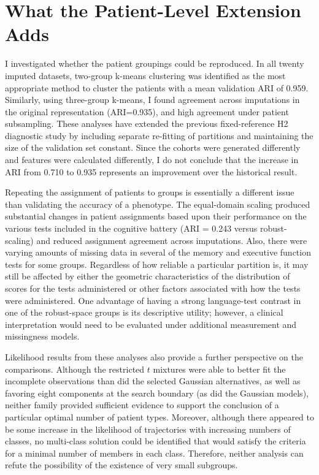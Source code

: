\section{What the Patient-Level Extension Adds}\label{sec:extension_discussion}

I investigated whether the patient groupings could be reproduced. In all twenty imputed datasets, two-group k-means clustering was identified as the most appropriate method to cluster the patients with a mean validation ARI of 0.959. Similarly, using three-group k-means, I found agreement across imputations in the original representation (ARI=0.935), and high agreement under patient subsampling. These analyses have extended the previous fixed-reference H2 diagnostic study by including separate re-fitting of partitions and maintaining the size of the validation set constant. Since the cohorts were generated differently and features were calculated differently, I do not conclude that the increase in ARI from 0.710 to 0.935 represents an improvement over the historical result.

Repeating the assignment of patients to groups is essentially a different issue than validating the accuracy of a phenotype. The equal-domain scaling produced substantial changes in patient assignments based upon their performance on the various tests included in the cognitive battery (ARI = 0.243 versus robust-scaling) and reduced assignment agreement across imputations. Also, there were varying amounts of missing data in several of the memory and executive function tests for some groups. Regardless of how reliable a particular partition is, it may still be affected by either the geometric characteristics of the distribution of scores for the tests administered or other factors associated with how the tests were administered. One advantage of having a strong language-test contrast in one of the robust-space groups is its descriptive utility; however, a clinical interpretation would need to be evaluated under additional measurement and missingness models.

Likelihood results from these analyses also provide a further perspective on the comparisons. Although the restricted $t$ mixtures were able to better fit the incomplete observations than did the selected Gaussian alternatives, as well as favoring eight components at the search boundary (as did the Gaussian models), neither family provided sufficient evidence to support the conclusion of a particular optimal number of patient types. Moreover, although there appeared to be some increase in the likelihood of trajectories with increasing numbers of classes, no multi-class solution could be identified that would satisfy the criteria for a minimal number of members in each class. Therefore, neither analysis can refute the possibility of the existence of very small subgroups.

